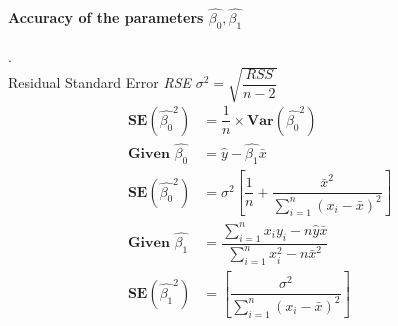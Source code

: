 \documentclass[12pt,a4paper]{report}
\begin{document}
\paragraph{Accuracy of the parameters $\hat{\beta_{0}}, \hat{\beta_{1}}$}.\\
Residual Standard Error \textit{RSE} $\sigma^{2}=\sqrt{\dfrac{\textit{RSS}}{n-2}}$
\begin{align*}
\textbf{SE}(\hat{\beta_{0}}^{2}) &= \dfrac{1}{n} \times \textbf{Var}(\hat{\beta_{0}}^{2})\\
\textbf{Given } \hat{\beta_{0}} &= \hat{y}-\hat{\beta_{1}} \bar{x} \\
\textbf{SE}(\hat{\beta_{0}}^{2}) &=\sigma^{2}\left[\dfrac{1}{n} + \dfrac{\bar{x}^{2}}{\sum_{i=1}^{n} (x_{i}-\bar{x})^{2}}\right]\\
\textbf{Given }\hat{\beta_{1}} & = \dfrac{\displaystyle \sum_{i=1}^{n} x_{i} y_{i}  -  n \hat{y}\bar{x} }{\displaystyle \sum_{i=1}^{n}  x_{i}^{2} - n\bar{x}^{2}}\\
\textbf{SE}(\hat{\beta_{1}}^{2}) &=\left[\dfrac{\sigma^{2}}{\sum_{i=1}^{n} (x_{i}-\bar{x})^{2}}\right]
\end{align*}
\end{document}
